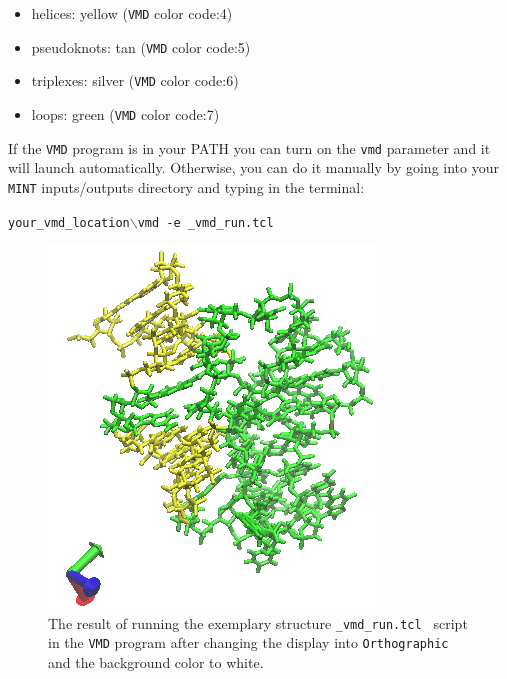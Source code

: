 \documentclass[12pt]{article}
\begin{document}
\begin{itemize}
\item helices: yellow ({\tt VMD} color code:4)
\item pseudoknots: tan ({\tt VMD} color code:5)
\item triplexes: silver ({\tt VMD} color code:6)
\item loops: green ({\tt VMD} color code:7)
\end{itemize}

If the {\tt VMD} program is in your PATH you can turn on the {\tt vmd} parameter and it will launch automatically. Otherwise, you can do it manually by going into your {\tt MINT} inputs/outputs directory and typing in the terminal:

{\tt your\_vmd\_location$\backslash$vmd -e \_vmd\_run.tcl }

\begin{figure}[h!]
\centering
\includegraphics[scale=0.8]{./pictures/motifs_vmd.png}
\caption{The result of running the exemplary structure {\tt \_vmd\_run.tcl } script in the {\tt VMD} program after changing the display into {\tt Orthographic} and the background color to white.}
\end{figure}
\end{document}

